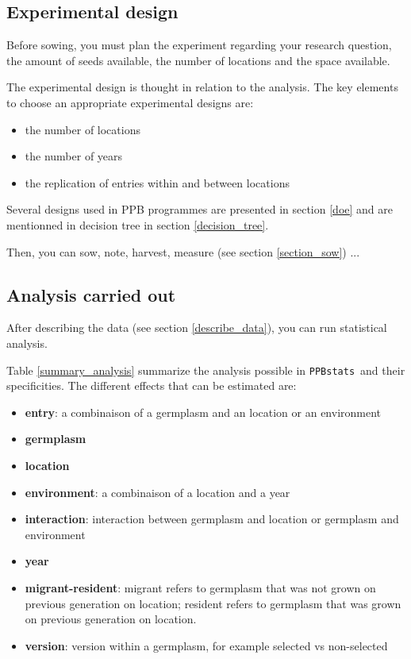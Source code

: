 \documentclass{book}\usepackage[]{graphicx}\usepackage[]{color}
\newcommand{\pack}{\texttt{PPBstats}}
\begin{document}
\subsection{Experimental design}

Before sowing, you must plan the experiment regarding your research question, the amount of seeds available, the number of locations and the space available.

The experimental design is thought in relation to the analysis.
The key elements to choose an appropriate experimental designs are:
\begin{itemize}
\item the number of locations
\item the number of years
\item the replication of entries within and between locations
\end{itemize}

\noindent Several designs used in PPB programmes are presented in section \ref{doe} and are mentionned in decision tree in section \ref{decision_tree}.

Then, you can sow, note, harvest, measure (see section \ref{section_sow}) ...


\subsection{Analysis carried out}

After describing the data (see section \ref{describe_data}), you can run statistical analysis.

Table \ref{summary_analysis} summarize the analysis possible in \pack~and their specificities.
The different effects that can be estimated are:
\begin{itemize}
\item \textbf{entry}: a combinaison of a germplasm and an location or an environment
\item \textbf{germplasm}
\item \textbf{location}
\item \textbf{environment}: a combinaison of a location and a year
\item \textbf{interaction}: interaction between germplasm and location or germplasm and environment
\item \textbf{year}
\item \textbf{migrant-resident}: migrant refers to germplasm that was not grown on previous generation on location; resident refers to germplasm that was grown  on previous generation on location.
\item \textbf{version}: version within a germplasm, for example selected vs non-selected
\end{itemize}
\end{document}
